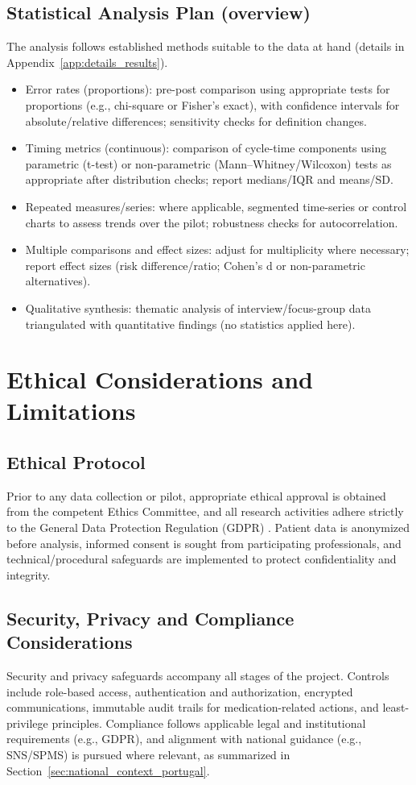 \subsection{Statistical Analysis Plan (overview)}
The analysis follows established methods suitable to the data at hand (details in Appendix~\ref{app:details_results}).
\begin{itemize}
    \item Error rates (proportions): pre-post comparison using appropriate tests for proportions (e.g., chi-square or Fisher's exact), with confidence intervals for absolute/relative differences; sensitivity checks for definition changes.
    \item Timing metrics (continuous): comparison of cycle-time components using parametric (t-test) or non-parametric (Mann–Whitney/Wilcoxon) tests as appropriate after distribution checks; report medians/IQR and means/SD.
    \item Repeated measures/series: where applicable, segmented time-series or control charts to assess trends over the pilot; robustness checks for autocorrelation.
    \item Multiple comparisons and effect sizes: adjust for multiplicity where necessary; report effect sizes (risk difference/ratio; Cohen's d or non-parametric alternatives).
    \item Qualitative synthesis: thematic analysis of interview/focus-group data triangulated with quantitative findings (no statistics applied here).
\end{itemize}

\section{Ethical Considerations and Limitations}

\subsection{Ethical Protocol}
Prior to any data collection or pilot, appropriate ethical approval is obtained from the competent Ethics Committee, and all research activities adhere strictly to the General Data Protection Regulation (GDPR) \cite{european2016}. Patient data is anonymized before analysis, informed consent is sought from participating professionals, and technical/procedural safeguards are implemented to protect confidentiality and integrity.

\subsection{Security, Privacy and Compliance Considerations}
\begingroup\sloppy
Security and privacy safeguards accompany all stages of the project. Controls include role-based access, authentication and authorization, encrypted communications, immutable audit trails for medication-related actions, and least-privilege principles. Compliance follows applicable legal and institutional requirements (e.g., GDPR), and alignment with national guidance (e.g., SNS/SPMS) is pursued where relevant, as summarized in Section~\ref{sec:national_context_portugal}.
\endgroup

